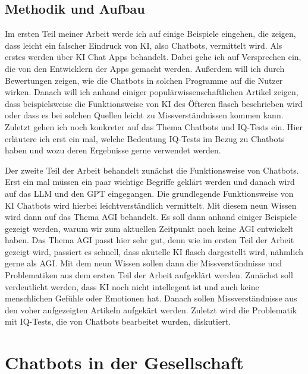 	\clearpage
	\subsection{Methodik und Aufbau} 
	Im ersten Teil meiner Arbeit werde ich auf einige Beispiele eingehen, die zeigen, dass leicht
	ein falscher Eindruck von KI, also Chatbots, vermittelt wird.
	Als erstes werden über KI Chat Apps behandelt. Dabei gehe ich auf Versprechen ein, 
	die von den Entwicklern der Apps gemacht werden. Außerdem will ich durch Bewertungen zeigen,
	wie die Chatbots in solchen Programme auf die Nutzer wirken.
	Danach will ich anhand einiger populärwissenschaftlichen Artikel zeigen, dass beispielsweise
	die Funktionsweise von KI des Öfteren flasch beschrieben wird oder dass es bei solchen Quellen
	leicht zu Missverständnissen kommen kann.
	Zuletzt gehen ich noch konkreter auf das Thema Chatbots und IQ-Tests ein. Hier erläutere ich
	erst ein mal, welche Bedeutung IQ-Tests im Bezug zu Chatbots haben und wozu deren Ergebnisse
	gerne verwendet werden.
	
	Der zweite Teil der Arbeit behandelt zunächst die Funktionsweise von Chatbots.
	Erst ein mal müssen ein paar wichtige Begriffe geklärt werden und danach wird 
	auf das LLM und den GPT eingegangen. Die grundlegende Funktionsweise von KI Chatbots
	wird hierbei leichtverständlich vermittelt.
	Mit diesem neun Wissen wird dann auf das Thema AGI behandelt. Es soll dann anhand
	einiger Beispiele gezeigt werden, warum wir zum aktuellen Zeitpunkt noch keine AGI
	entwickelt haben. Das Thema AGI passt hier sehr gut, denn wie im ersten Teil der 
	Arbeit gezeigt wird, passiert es schnell, dass akutelle KI flasch dargestellt wird, 
	nähmlich gerne als AGI.     	    
	Mit dem neun Wissen sollen dann die Missverständnisse und Problematiken aus dem ersten 
	Teil der Arbeit aufgeklärt werden. Zunächst soll verdeutlicht werden, dass KI noch nicht
	intellegent ist und auch keine menschlichen Gefühle oder Emotionen hat. Danach sollen 
	Missverständnisse aus den voher aufgezeigten Artikeln aufgekärt werden. Zuletzt wird die
	Problematik mit IQ-Tests, die von Chatbots bearbeitet wurden, diskutiert.  	
	
	
	\clearpage
\section{Chatbots in der Gesellschaft}

